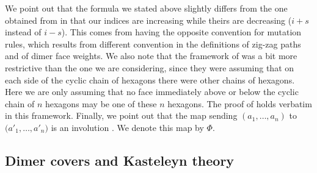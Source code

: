 \documentclass[10pt,a4paper]{amsart}
\numberwithin{equation}{section}
\begin{document}
	
	We point out that the formula we stated above slightly differs from the one obtained from \cite{ILP1} in that our indices are increasing while theirs are decreasing ($i+s$ instead of $i-s$). This comes from having the opposite convention for mutation rules, which results from different convention in the definitions of zig-zag paths and of dimer face weights. We also note that the framework of \cite{ILP1} was a bit more restrictive than the one we are considering, since they were assuming that on each side of the cyclic chain of hexagons there were other chains of hexagons. Here we are only assuming that no face immediately above or below the cyclic chain of $n$ hexagons may be one of these $n$ hexagons. The proof of \cite{ILP1} holds verbatim in this framework. Finally, we point out that the map sending $(a_1,\dots,a_n)$ to $\big(a'_1,\dots,a'_n\big)$ is an involution \cite{ILP1}. We denote this map by $\Phi$.
	
	\subsection{Dimer covers and Kasteleyn theory}
	
\end{document}
